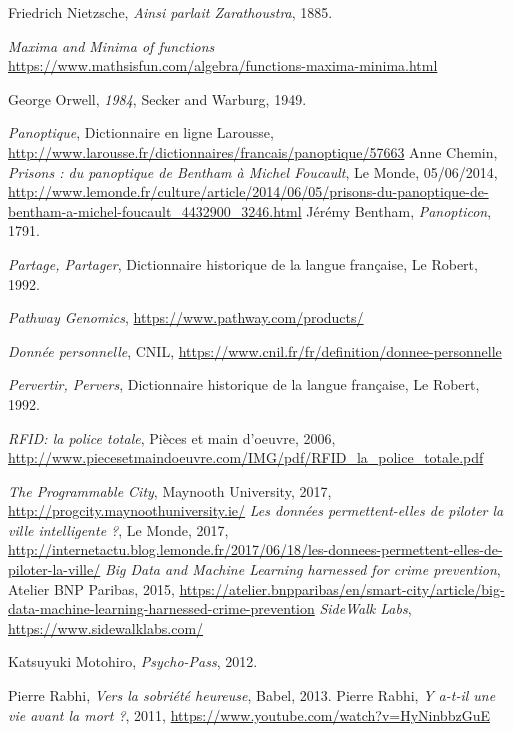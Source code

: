 \begin{thebibliography}{99}
     Friedrich Nietzsche, \emph{Ainsi parlait Zarathoustra}, 1885.

     \emph{Maxima and Minima of functions} \url{https://www.mathsisfun.com/algebra/functions-maxima-minima.html}

     George Orwell, \emph{1984}, Secker and Warburg, 1949.

     \emph{Panoptique}, Dictionnaire en ligne Larousse, \url{http://www.larousse.fr/dictionnaires/francais/panoptique/57663}
     Anne Chemin, \emph{Prisons : du panoptique de Bentham à Michel Foucault}, Le Monde, 05/06/2014, \url{http://www.lemonde.fr/culture/article/2014/06/05/prisons-du-panoptique-de-bentham-a-michel-foucault_4432900_3246.html}
     Jérémy Bentham, \emph{Panopticon}, 1791.

     \emph{Partage, Partager}, Dictionnaire historique de la langue française, Le Robert, 1992.

     \emph{Pathway Genomics}, \url{https://www.pathway.com/products/}

     \emph{Donnée personnelle}, CNIL, \url{https://www.cnil.fr/fr/definition/donnee-personnelle}

     \emph{Pervertir, Pervers}, Dictionnaire historique de la langue française, Le Robert, 1992.

     \emph{RFID: la police totale}, Pièces et main d'oeuvre, 2006, \url{http://www.piecesetmaindoeuvre.com/IMG/pdf/RFID_la_police_totale.pdf}

     \emph{The Programmable City}, Maynooth University, 2017, \url{http://progcity.maynoothuniversity.ie/}
     \emph{Les données permettent-elles de piloter la ville intelligente ?}, Le Monde, 2017, \url{http://internetactu.blog.lemonde.fr/2017/06/18/les-donnees-permettent-elles-de-piloter-la-ville/}
     \emph{Big Data and Machine Learning harnessed for crime prevention}, Atelier BNP Paribas, 2015, \url{https://atelier.bnpparibas/en/smart-city/article/big-data-machine-learning-harnessed-crime-prevention}
     \emph{SideWalk Labs}, \url{https://www.sidewalklabs.com/}

     Katsuyuki Motohiro, \emph{Psycho-Pass}, 2012.

     Pierre Rabhi, \emph{Vers la sobriété heureuse}, Babel, 2013.
     Pierre Rabhi, \emph{Y a-t-il une vie avant la mort ?}, 2011, \url{https://www.youtube.com/watch?v=HyNinbbzGuE}


\end{thebibliography}
